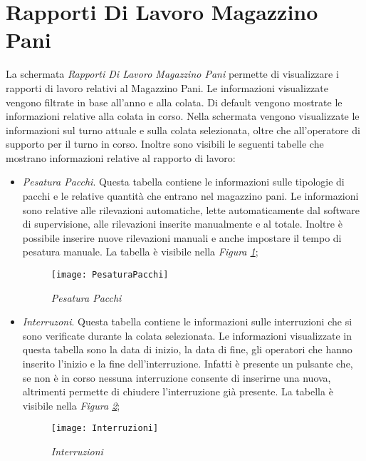   \section{Rapporti Di Lavoro Magazzino Pani}
  La schermata \textit{Rapporti Di Lavoro Magazzino Pani} permette di visualizzare
  i rapporti di lavoro relativi al Magazzino Pani. Le informazioni visualizzate vengono filtrate in base
  all'anno e alla colata. Di default vengono mostrate le informazioni relative alla colata in corso. Nella schermata vengono
  visualizzate le informazioni sul turno attuale e sulla colata selezionata, oltre che all'operatore di supporto per il turno
  in corso. Inoltre sono visibili le seguenti tabelle che mostrano informazioni relative al rapporto di lavoro:
  \begin{itemize}
    \item \textit{Pesatura Pacchi}. Questa tabella contiene le informazioni sulle tipologie di pacchi e le relative quantità
    che entrano nel magazzino pani. Le informazioni sono relative alle rilevazioni automatiche, lette automaticamente dal
    software di supervisione, alle rilevazioni inserite manualmente e al totale. Inoltre è possibile inserire nuove rilevazioni
    manuali e anche impostare il tempo di pesatura manuale. La tabella è visibile nella 
    \textit{Figura \ref{fig:PesaturaPacchi}};

    \begin{figure}[H]
      \texttt{[image: PesaturaPacchi]}
      \centering
      \caption{\textit{Pesatura Pacchi}}
      \label{fig:PesaturaPacchi}
    \end{figure}

    \item \textit{Interruzoni}. Questa tabella contiene le informazioni sulle interruzioni che si sono verificate durante la
    colata selezionata. Le informazioni visualizzate in questa tabella sono la data di inizio, la data di fine, gli operatori
    che hanno inserito l'inizio e la fine dell'interruzione. Infatti è presente un pulsante che, se non è in corso nessuna interruzione
    consente di inserirne una nuova, altrimenti permette di chiudere l'interruzione già presente. La tabella è
    visibile nella \textit{Figura \ref{fig:Interruzioni}};

    \begin{figure}[H]
      \texttt{[image: Interruzioni]}
      \centering
      \caption{\textit{Interruzioni}}
      \label{fig:Interruzioni}
    \end{figure}


\end{itemize}
